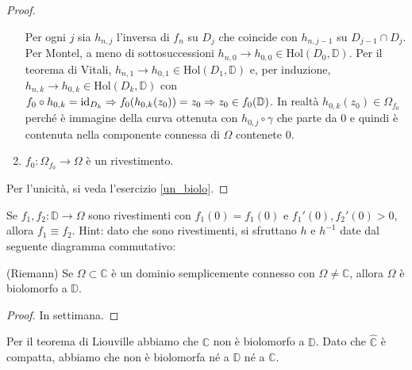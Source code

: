 \begin{proof}
\begin{enumerate}
    Per ogni $j$ sia $h_{n, j}$ l'inversa di $f_n$ su $D_j$ che coincide con $h_{n, j-1}$ su $D_{j-1} \cap D_j$. Per Montel, a meno di sottosuccessioni $h_{n, 0} \longrightarrow h_{0, 0} \in \text{Hol}(D_0, \mathbb{D})$.
    Per il teorema di Vitali, $h_{n, 1} \longrightarrow h_{0, 1} \in \text{Hol}(D_1, \mathbb{D})$ e, per induzione, $h_{n, k} \longrightarrow h_{0, k} \in \text{Hol}(D_k, \mathbb{D})$ con $f_0 \circ h_{0, k}=\operatorname{id}_{D_k} \Rightarrow f_0(h_{0, k}(z_0))=z_0 \Rightarrow z_0 \in f_0(\mathbb{D})$.
    In realtà $h_{0, k}(z_0) \in \Omega_{f_0}$ perché è immagine della curva ottenuta con $h_{0, j} \circ \gamma$ che parte da $0$ e quindi è contenuta nella componente connessa di $\Omega$ contenete $0$.
    \item $f_0:\Omega_{f_0} \longrightarrow \Omega$ è un rivestimento.
  \end{enumerate}

  Per l'unicità, si veda l'esercizio \ref{un_biolo}.
\end{proof}

\begin{exc} \label{un_biolo}
  Se $f_1, f_2:\mathbb{D} \longrightarrow \Omega$ sono rivestimenti con $f_1(0)=f_1(0)$ e $f_1'(0), f_2'(0)>0$, allora $f_1 \equiv f_2$. Hint: dato che sono rivestimenti, si sfruttano $h$ e $h^{-1}$ date dal seguente diagramma commutativo:
  \begin{center}
  \end{center}
\end{exc}

\begin{thm}
  (Riemann) Se $\Omega \subset \mathbb{C}$ è un dominio semplicemente connesso con $\Omega \not=\mathbb{C}$, allora $\Omega$ è biolomorfo a $\mathbb{D}$.
\end{thm}

\begin{proof}
  In settimana.
\end{proof}

Per il teorema di Liouville abbiamo che $\mathbb{C}$ non è biolomorfo a $\mathbb{D}$. Dato che $\widehat{\mathbb{C}}$ è compatta, abbiamo che non è biolomorfa né a $\mathbb{D}$ né a $\mathbb{C}$.

